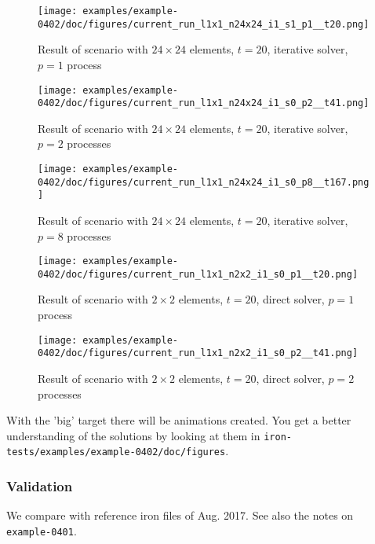 \begin{figure}[ht]
  \centering
  \texttt{[image: examples/example-0402/doc/figures/current\_run\_l1x1\_n24x24\_i1\_s1\_p1\_\_t20.png]}
  \caption{Result of scenario with $24 \times 24$ elements, $t=20$, iterative solver, $p=1$ process}
  \label{example-0402-current-run3-fig}
\end{figure}

\begin{figure}[ht]
  \centering
  \texttt{[image: examples/example-0402/doc/figures/current\_run\_l1x1\_n24x24\_i1\_s0\_p2\_\_t41.png]}
  \caption{Result of scenario with $24 \times 24$ elements, $t=20$, iterative solver, $p=2$ processes}
  \label{example-0402-current-run4-fig}
\end{figure}

\begin{figure}[ht]
  \centering
  \texttt{[image: examples/example-0402/doc/figures/current\_run\_l1x1\_n24x24\_i1\_s0\_p8\_\_t167.png]}
  \caption{Result of scenario with $24 \times 24$ elements, $t=20$, iterative solver, $p=8$ processes}
  \label{example-0402-current-run5-fig}
\end{figure}

\begin{figure}[ht]
  \centering
  \texttt{[image: examples/example-0402/doc/figures/current\_run\_l1x1\_n2x2\_i1\_s0\_p1\_\_t20.png]}
  \caption{Result of scenario with $2 \times 2$ elements, $t=20$, direct solver, $p=1$ process}
  \label{example-0402-current-run6-fig}
\end{figure}

\begin{figure}[ht]
  \centering
  \texttt{[image: examples/example-0402/doc/figures/current\_run\_l1x1\_n2x2\_i1\_s0\_p2\_\_t41.png]}
  \caption{Result of scenario with $2 \times 2$ elements, $t=20$, direct solver, $p=2$ processes}
  \label{example-0402-current-run7-fig}
\end{figure}

With the 'big' target there will be animations created. You get a better understanding of the solutions by looking at them in \verb|iron-tests/examples/example-0402/doc/figures|.

%
%
\subsubsection{Validation}
%
We compare with reference iron files of Aug. 2017. See also the notes on \verb|example-0401|.

%
